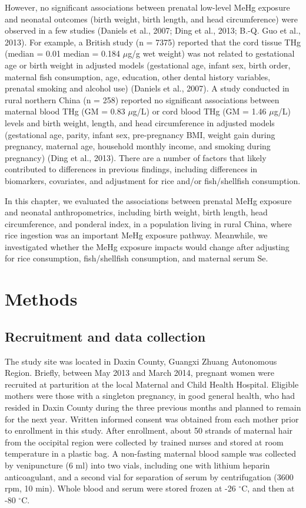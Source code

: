 However, no significant associations between prenatal low-level MeHg exposure and neonatal outcomes (birth weight, birth length, and head circumference) were observed in a few studies (Daniels et al., 2007; Ding et al., 2013; B.-Q. Guo et al., 2013). For example, a British study (n = 7375) reported that the cord tissue THg (median = 0.01 median = 0.184 ${\mu}$g/g wet weight) was not related to gestational age or birth weight in adjusted models (gestational age, infant sex, birth order, maternal fish consumption, age, education, other dental history variables, prenatal smoking and alcohol use) (Daniels et al., 2007). A study conducted in rural northern China (n = 258) reported no significant associations between maternal blood THg (GM = 0.83 ${\mu}$g/L) or cord blood THg (GM = 1.46 ${\mu}$g/L) levels and birth weight, length, and head circumference in adjusted models (gestational age, parity, infant sex, pre-pregnancy BMI, weight gain during pregnancy, maternal age, household monthly income, and smoking during pregnancy) (Ding et al., 2013). There are a number of factors that likely contributed to differences in previous findings, including differences in biomarkers, covariates, and adjustment for rice and/or fish/shellfish consumption.

In this chapter, we evaluated the associations between prenatal MeHg exposure and neonatal anthropometrics, including birth weight, birth length, head circumference, and ponderal index, in a population living in rural China, where rice ingestion was an important MeHg exposure pathway. Meanwhile, we investigated whether the MeHg exposure impacts would change after adjusting for rice consumption, fish/shellfish consumption, and maternal serum Se.

\section{Methods}

\subsection{Recruitment and data collection}

The study site was located in Daxin County, Guangxi Zhuang Autonomous Region. Briefly, between May 2013 and March 2014, pregnant women were recruited at parturition at the local Maternal and Child Health Hospital. Eligible mothers were those with a singleton pregnancy, in good general health, who had resided in Daxin County during the three previous months and planned to remain for the next year. Written informed consent was obtained from each mother prior to enrollment in this study.
After enrollment, about 50 strands of maternal hair from the occipital region were collected by trained nurses and stored at room temperature in a plastic bag. A non-fasting maternal blood sample was collected by venipuncture (6 ml) into two vials, including one with lithium heparin anticoagulant, and a second vial for separation of serum by centrifugation (3600 rpm, 10 min). Whole blood and serum were stored frozen at -26 \({^\circ}\)C, and then at -80 \({^\circ}\)C.

